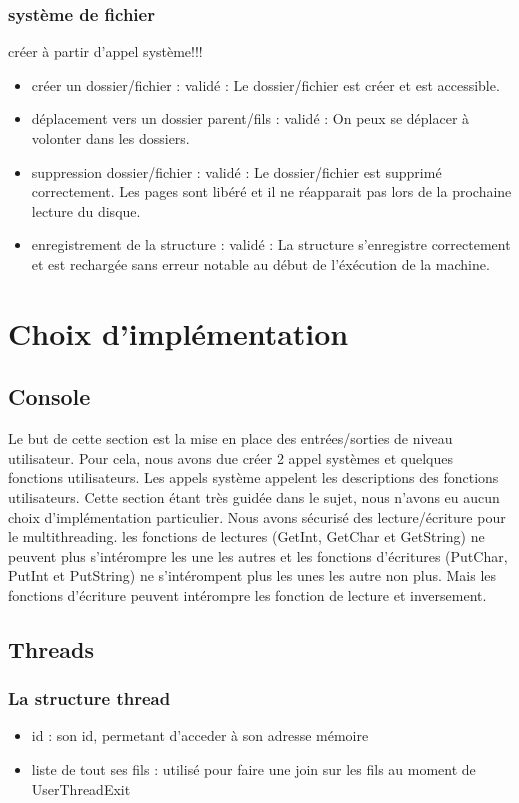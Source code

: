 \documentclass{article}
\begin{document}
		\subsubsection{système de fichier}
		créer à partir d'appel système!!!
			\begin{itemize}
				\item créer un dossier/fichier :				validé : Le dossier/fichier est créer et est accessible.
				\item déplacement vers un dossier parent/fils :	validé : On peux se déplacer à volonter dans les dossiers.
				\item suppression dossier/fichier :				validé : Le dossier/fichier est supprimé correctement. Les pages sont libéré et il ne réapparait pas lors de la prochaine lecture du disque.
				\item enregistrement de la structure :			validé : La structure s'enregistre correctement et est rechargée sans erreur notable au début de l'éxécution de la machine.
			\end{itemize}

\section{Choix d'implémentation}
	\subsection{Console}
	    {Le but de cette section est la mise en place des entrées/sorties de niveau utilisateur. Pour cela, nous avons due créer 2 appel systèmes et quelques fonctions utilisateurs. Les appels système appelent les descriptions des fonctions utilisateurs. Cette section étant très guidée dans le sujet, nous n'avons eu aucun choix d'implémentation particulier.
	    Nous avons sécurisé des lecture/écriture pour le multithreading. les fonctions de lectures (GetInt, GetChar et GetString) ne peuvent plus s'intérompre les une les autres et les fonctions d'écritures (PutChar, PutInt et PutString) ne s'intérompent plus les unes les autre non plus. Mais les fonctions d'écriture peuvent intérompre les fonction de lecture et inversement.}

	\subsection{Threads}
		\subsubsection{La structure thread}
			\begin{itemize}
				\item id : son id, permetant d'acceder à son adresse mémoire
				\item liste de tout ses fils : utilisé pour faire une join sur les fils au moment de UserThreadExit
			\end{itemize}
\end{document}
